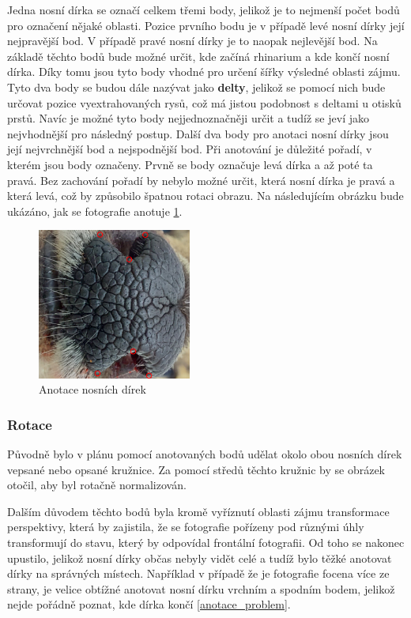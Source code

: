Jedna nosní dírka se označí celkem třemi body, jelikož je to nejmenší počet bodů pro označení nějaké oblasti. Pozice prvního bodu je v případě levé nosní dírky její nejpravější bod. V případě pravé nosní dírky je to naopak nejlevější bod. Na základě těchto bodů bude možné určit, kde začíná rhinarium a kde končí nosní dírka. Díky tomu jsou tyto body vhodné pro určení šířky výsledné oblasti zájmu. Tyto dva body se budou dále nazývat jako \textbf{delty}, jelikož se pomocí nich bude určovat pozice vyextrahovaných rysů, což má jistou podobnost s deltami u otisků prstů. Navíc je možné tyto body nejjednoznačněji určit a tudíž se jeví jako nejvhodnější pro následný postup. Další dva body pro anotaci nosní dírky jsou její nejvrchnější bod a nejspodnější bod. Při anotování je důležité pořadí, v kterém jsou body označeny. Prvně se body označuje levá dírka a až poté ta pravá. Bez zachování pořadí by nebylo možné určit, která nosní dírka je pravá a která levá, což by způsobilo špatnou rotaci obrazu. Na následujícím obrázku bude ukázáno, jak se fotografie anotuje \ref{anotace}.

\newpage
\begin{figure}[h]
	\centering
	\includegraphics[width=0.45\textwidth]{obrazky/1_points.png}
	\caption{Anotace nosních dírek}
	\label{anotace}
\end{figure}

\subsubsection{Rotace}

Původně bylo v plánu pomocí anotovaných bodů udělat okolo obou nosních dírek vepsané nebo opsané kružnice. Za pomocí středů těchto kružnic by se obrázek otočil, aby byl rotačně normalizován.


Dalším důvodem těchto bodů byla kromě vyříznutí oblasti zájmu transformace perspektivy, která by zajistila, že se fotografie pořízeny pod různými úhly transformují do stavu, který by odpovídal frontální fotografii. Od toho se nakonec upustilo, jelikož nosní dírky občas nebyly vidět celé a tudíž bylo těžké anotovat dírky na správných místech. Například v případě že je fotografie focena více ze strany, je velice obtížné anotovat nosní dírku vrchním a spodním bodem, jelikož nejde pořádně poznat, kde dírka končí \ref{anotace_problem}.


